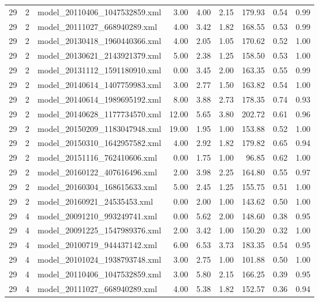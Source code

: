 \begin{table}[ht]
\begin{tabular}{rrlrrrrrr}
   29 &   2 & model\_20110406\_1047532859.xml & 3.00 & 4.00 & 2.15 & 179.93 & 0.54 & 0.99 \\ 
   29 &   2 & model\_20111027\_668940289.xml & 4.00 & 3.42 & 1.82 & 168.55 & 0.53 & 0.99 \\ 
   29 &   2 & model\_20130418\_1960440366.xml & 4.00 & 2.05 & 1.05 & 170.62 & 0.52 & 1.00 \\ 
   29 &   2 & model\_20130621\_2143921379.xml & 5.00 & 2.38 & 1.25 & 158.50 & 0.53 & 1.00 \\ 
   29 &   2 & model\_20131112\_1591180910.xml & 0.00 & 3.45 & 2.00 & 163.35 & 0.55 & 0.99 \\ 
   29 &   2 & model\_20140614\_1407759983.xml & 3.00 & 2.77 & 1.50 & 163.82 & 0.54 & 1.00 \\ 
   29 &   2 & model\_20140614\_1989695192.xml & 8.00 & 3.88 & 2.73 & 178.35 & 0.74 & 0.93 \\ 
   29 &   2 & model\_20140628\_1177734570.xml & 12.00 & 5.65 & 3.80 & 202.72 & 0.61 & 0.96 \\ 
   29 &   2 & model\_20150209\_1183047948.xml & 19.00 & 1.95 & 1.00 & 153.88 & 0.52 & 1.00 \\ 
   29 &   2 & model\_20150310\_1642957582.xml & 4.00 & 2.92 & 1.82 & 179.82 & 0.65 & 0.94 \\ 
   29 &   2 & model\_20151116\_762410606.xml & 0.00 & 1.75 & 1.00 & 96.85 & 0.62 & 1.00 \\ 
   29 &   2 & model\_20160122\_407616496.xml & 2.00 & 3.98 & 2.25 & 164.80 & 0.55 & 0.97 \\ 
   29 &   2 & model\_20160304\_168615633.xml & 5.00 & 2.45 & 1.25 & 155.75 & 0.51 & 1.00 \\ 
   29 &   2 & model\_20160921\_24535453.xml & 0.00 & 2.00 & 1.00 & 143.62 & 0.50 & 1.00 \\ 
   29 &   4 & model\_20091210\_993249741.xml & 0.00 & 5.62 & 2.00 & 148.60 & 0.38 & 0.95 \\ 
   29 &   4 & model\_20091225\_1547989376.xml & 2.00 & 3.42 & 1.00 & 150.20 & 0.32 & 1.00 \\ 
   29 &   4 & model\_20100719\_944437142.xml & 6.00 & 6.53 & 3.73 & 183.35 & 0.54 & 0.95 \\ 
   29 &   4 & model\_20101024\_1938793748.xml & 3.00 & 2.75 & 1.00 & 101.88 & 0.50 & 1.00 \\ 
   29 &   4 & model\_20110406\_1047532859.xml & 3.00 & 5.80 & 2.15 & 166.25 & 0.39 & 0.95 \\ 
   29 &   4 & model\_20111027\_668940289.xml & 4.00 & 5.38 & 1.82 & 152.57 & 0.36 & 0.94 \\ 

\end{tabular}
\end{table}
